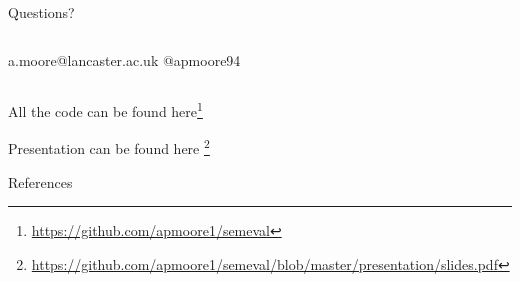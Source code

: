 \documentclass[10pt]{beamer}
\begin{document}
\begin{frame}[plain]
\begin{center}
\begin{center}
\huge Questions?
\end{center}
\begin{center}
\begin{columns}[T,onlytextwidth]
\centering
\normalsize a.moore@lancaster.ac.uk
\centering
\normalsize @apmoore94
\end{columns}
\end{center}
\end{center}

\begin{center}
\begin{center}
\small All the code can be found here\footnote{\url{https://github.com/apmoore1/semeval}}
\end{center}
\begin{center}
\small Presentation can be found here \footnote{\url{https://github.com/apmoore1/semeval/blob/master/presentation/slides.pdf}}
\end{center}
\end{center}

\end{frame}




\begin{frame}[allowframebreaks]{References}
  
  

\end{frame}
\end{document}
